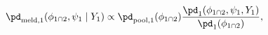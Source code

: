 \begin{equation}
  \pd_{\text{meld}, 1} (\phi_{1 \cap 2}, \psi_{1} \mid Y_{1}) \propto
  \pd_{\text{pool}, 1}(\phi_{1 \cap 2})
  \frac {
    \pd_{1}(\phi_{1 \cap 2}, \psi_{1}, Y_{1})
  } {
    \pd_{1}(\phi_{1 \cap 2})
  },
  \label{eqn:stage-one-target}
\end{equation}